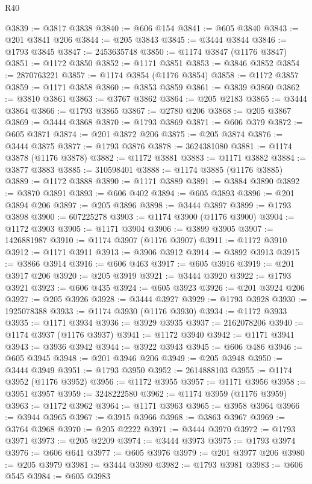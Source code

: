 \begin{lexlean}{R40}
\begin{coremodule}
@3839 := @3817 @3838
@3840 := @606 @154
@3841 := @605 @3840
@3843 := @201 @3841 @206
@3844 := @205 @3843
@3845 := @3444 @3844
@3846 := @1793 @3845
@3847 := 2453635748
@3850 := @1174 @3847 (@1176 @3847)
@3851 := @1172 @3850
@3852 := @1171 @3851
@3853 := @3846 @3852
@3854 := 2870763221
@3857 := @1174 @3854 (@1176 @3854)
@3858 := @1172 @3857
@3859 := @1171 @3858
@3860 := @3853 @3859
@3861 := @3839 @3860
@3862 := @3810 @3861
@3863 := @3767 @3862
@3864 := @205 @2183
@3865 := @3444 @3864
@3866 := @1793 @3865
@3867 := @2780 @206
@3868 := @205 @3867
@3869 := @3444 @3868
@3870 := @1793 @3869
@3871 := @606 @379
@3872 := @605 @3871
@3874 := @201 @3872 @206
@3875 := @205 @3874
@3876 := @3444 @3875
@3877 := @1793 @3876
@3878 := 3624381080
@3881 := @1174 @3878 (@1176 @3878)
@3882 := @1172 @3881
@3883 := @1171 @3882
@3884 := @3877 @3883
@3885 := 310598401
@3888 := @1174 @3885 (@1176 @3885)
@3889 := @1172 @3888
@3890 := @1171 @3889
@3891 := @3884 @3890
@3892 := @3870 @3891
@3893 := @606 @402
@3894 := @605 @3893
@3896 := @201 @3894 @206
@3897 := @205 @3896
@3898 := @3444 @3897
@3899 := @1793 @3898
@3900 := 607225278
@3903 := @1174 @3900 (@1176 @3900)
@3904 := @1172 @3903
@3905 := @1171 @3904
@3906 := @3899 @3905
@3907 := 1426881987
@3910 := @1174 @3907 (@1176 @3907)
@3911 := @1172 @3910
@3912 := @1171 @3911
@3913 := @3906 @3912
@3914 := @3892 @3913
@3915 := @3866 @3914
@3916 := @606 @463
@3917 := @605 @3916
@3919 := @201 @3917 @206
@3920 := @205 @3919
@3921 := @3444 @3920
@3922 := @1793 @3921
@3923 := @606 @435
@3924 := @605 @3923
@3926 := @201 @3924 @206
@3927 := @205 @3926
@3928 := @3444 @3927
@3929 := @1793 @3928
@3930 := 1925078388
@3933 := @1174 @3930 (@1176 @3930)
@3934 := @1172 @3933
@3935 := @1171 @3934
@3936 := @3929 @3935
@3937 := 2162078206
@3940 := @1174 @3937 (@1176 @3937)
@3941 := @1172 @3940
@3942 := @1171 @3941
@3943 := @3936 @3942
@3944 := @3922 @3943
@3945 := @606 @486
@3946 := @605 @3945
@3948 := @201 @3946 @206
@3949 := @205 @3948
@3950 := @3444 @3949
@3951 := @1793 @3950
@3952 := 2614888103
@3955 := @1174 @3952 (@1176 @3952)
@3956 := @1172 @3955
@3957 := @1171 @3956
@3958 := @3951 @3957
@3959 := 3248222580
@3962 := @1174 @3959 (@1176 @3959)
@3963 := @1172 @3962
@3964 := @1171 @3963
@3965 := @3958 @3964
@3966 := @3944 @3965
@3967 := @3915 @3966
@3968 := @3863 @3967
@3969 := @3764 @3968
@3970 := @205 @2222
@3971 := @3444 @3970
@3972 := @1793 @3971
@3973 := @205 @2209
@3974 := @3444 @3973
@3975 := @1793 @3974
@3976 := @606 @641
@3977 := @605 @3976
@3979 := @201 @3977 @206
@3980 := @205 @3979
@3981 := @3444 @3980
@3982 := @1793 @3981
@3983 := @606 @545
@3984 := @605 @3983

\end{coremodule}
\end{lexlean}
